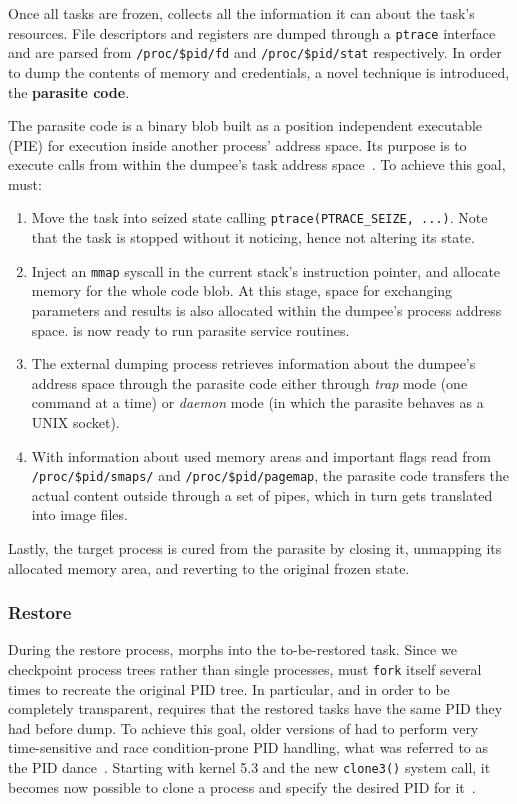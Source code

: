 Once all tasks are frozen, \criu collects all the information it can about the task's resources.
File descriptors and registers are dumped through a \texttt{ptrace} interface and are parsed from \texttt{/proc/\$pid/fd} and \texttt{/proc/\$pid/stat} respectively.
In order to dump the contents of memory and credentials, a novel technique is introduced, the \textbf{parasite code}.

The parasite code is a binary blob built as a position independent executable (PIE) for execution inside another process' address space.
Its purpose is to execute \criu calls from within the dumpee's task address space~\cite{criu-parasite-code}.
To achieve this goal, \criu must:
\begin{enumerate}
    \item Move the task into seized state calling \texttt{ptrace(PTRACE\_SEIZE, ...)}. Note that the task is stopped without it noticing, hence not altering its state.
    \item Inject an \texttt{mmap} syscall in the current stack's instruction pointer, and allocate memory for the whole code blob. At this stage, space for exchanging parameters and results is also allocated within the dumpee's process address space. \criu is now ready to run parasite service routines.
    \item The external dumping process retrieves information about the dumpee's address space through the parasite code either through \emph{trap} mode (one command at a time) or \emph{daemon} mode (in which the parasite behaves as a UNIX socket).
    \item With information about used memory areas and important flags read from \texttt{/proc/\$pid/smaps/} and \texttt{/proc/\$pid/pagemap}, the parasite code transfers the actual content outside through a set of pipes, which in turn gets translated into image files.
\end{enumerate}
Lastly, the target process is cured from the parasite by closing it, unmapping its allocated memory area, and reverting to the original frozen state.

\subsubsection*{Restore}

During the restore process, \criu morphs into the to-be-restored task.
Since we checkpoint process trees rather than single processes, \criu must \texttt{fork} itself several times to recreate the original PID tree.
In particular, and in order to be completely transparent, \criu requires that the restored tasks have the same PID they had before dump.
To achieve this goal, older versions of \criu had to perform very time-sensitive and race condition-prone PID handling, what was referred to as the PID dance~\cite{Reber2019,criu-pid-dance}.
Starting with kernel 5.3 and the new \texttt{clone3()} system call, it becomes now possible to clone a process and specify the desired PID for it~\cite{kernel-clone3}.


